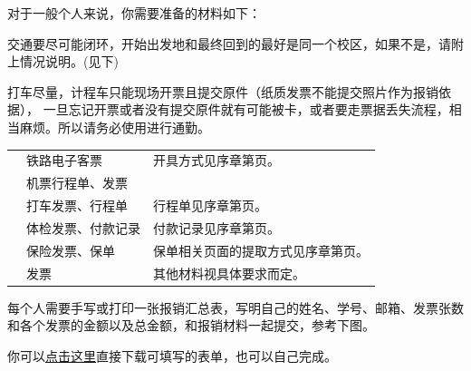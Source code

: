 \noindent 对于一般个人来说，你需要准备的材料如下：

交通要尽可能闭环，开始出发地和最终回到的最好是同一个校区，如果不是，请附上情况说明。(见下)

\begin{ReminderBox}
\normalfont\sffamily\fontsize{10}{17}\selectfont
打车尽量，计程车只能现场开票且提交原件（纸质发票不能提交照片作为报销依据），
一旦忘记开票或者没有提交原件就有可能被卡，或者要走票据丢失流程，相当麻烦。所以请务必使用进行通勤。
\end{ReminderBox}

\begingroup
\sffamily\fontsize{10}{17}\selectfont
\setlength{\tabcolsep}{8pt}
\renewcommand{\arraystretch}{1.12}
\begin{tabularx}{\linewidth}{@{}p{24mm}p{57mm}Y@{}}
\toprule
{} &  &  \\[4pt]\midrule
{} & 铁路电子客票 & 开具方式见序章第页。 \\[7pt]\midrule
{} & 机票行程单、发票 & \\[7pt]\midrule
{} & 打车发票、行程单 & 行程单见序章第页。 \\[7pt]\midrule
{} & 体检发票、付款记录 & 付款记录见序章第页。 \\[7pt]\midrule
{} & 保险发票、保单 & 保单相关页面的提取方式见序章第页。 \\[7pt]\midrule
{} & 发票 & 其他材料视具体要求而定。 \\[4pt]\bottomrule
\end{tabularx}\par
\endgroup



\Needspace{230mm}
每个人需要手写或打印一张报销汇总表，写明自己的姓名、学号、邮箱、发票张数和各个发票的金额以及总金额，和报销材料一起提交，参考下图。


你可以\href{https://github.com/PhSeCl/SYSU-Reimbursement-Handbook/releases/download/v2026.11.05/reimbursement-summary-form.pdf}{\textcolor{BookBlue}{点击这里}}直接下载可填写的表单，也可以自己完成。


